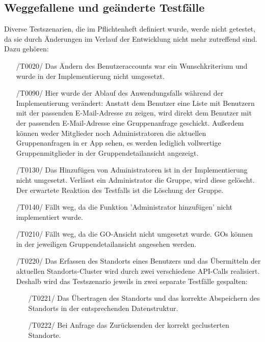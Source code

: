 \documentclass[11pt,a4paper]{scrartcl}
\begin{document}
\subsection{Weggefallene und geänderte Testfälle}\label{weggefallene Testfälle}
Diverse Testszenarien, die im Pflichtenheft definiert wurde, werde nicht getestet, da sie durch Änderungen im Verlauf der Entwicklung nicht mehr zutreffend sind. Dazu gehören:
\begin{itemize}
	\item[/T0020/] Das Ändern des Benutzeraccounts war ein Wunschkriterium und wurde in der Implementierung nicht umgesetzt.
	
	\item[/T0090/] Hier wurde der Ablauf des Anwendungsfalls während der Implementierung verändert: Anstatt dem Benutzer eine Liste mit Benutzern mit der passenden E-Mail-Adresse zu zeigen, wird direkt dem Benutzer mit der passenden E-Mail-Adresse eine Gruppenanfrage geschickt. Außerdem können weder Mitglieder noch Administratoren die aktuellen Gruppenanfragen in er App sehen, es werden lediglich vollwertige Gruppenmitglieder in der Gruppendetailansicht angezeigt.
	
	\item[/T0130/]\label{130} Das Hinzufügen von Administratoren ist in der Implementierung nicht umgesetzt. Verlässt ein Administrator die Gruppe, wird diese gelöscht. Der erwartete Reaktion des Testfalls ist die Löschung der Gruppe.
	
	\item[/T0140/] Fällt weg, da die Funktion 'Administrator hinzufügen' nicht implementiert wurde.
	
	\item[/T0210/] Fällt weg, da die GO-Ansicht nicht umgesetzt wurde. GOs können in der jeweiligen Gruppendetailansicht angesehen werden.
	
	\item[/T0220/] Das Erfassen des Standorts eines Benutzers und das Übermitteln der aktuellen Standorts-Cluster wird durch zwei verschiedene API-Calls realisiert. Deshalb wird das Testszenario jeweils in zwei separate Testfälle gespalten:
	\begin{enumerate}
		\item[/T0221/] Das Übertragen des Standorts und das korrekte Abspeichern des Standorts in der entsprechenden Datenstruktur.\label{221}
		\item[/T0222/] Bei Anfrage das Zurücksenden der korrekt geclusterten Standorte.\label{222}
	\end{enumerate}
	

\end{itemize}
\end{document}
